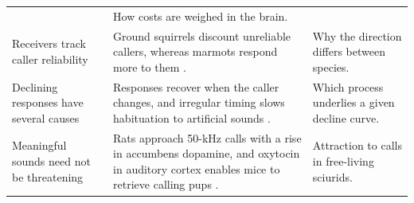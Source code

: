 \begin{table}[tbp]
\begin{tabular}{@{}>{\raggedright\arraybackslash}p{1.35in}>{\raggedright\arraybackslash}p{3.0in}>{\raggedright\arraybackslash}p{1.75in}@{}}
  & How costs are weighed in the brain. \\
Receivers track caller reliability
  & Ground squirrels discount unreliable callers, whereas marmots respond more to them \citep{HareAtkins2001,BlumsteinEtAl2004}.
  & Why the direction differs between species. \\
Declining responses have several causes
  & Responses recover when the caller changes, and irregular timing slows habituation to artificial sounds \citep{Hare1998,Davis1970,HerryEtAl2007}.
  & Which process underlies a given decline curve. \\
Meaningful sounds need not be threatening
  & Rats approach 50-kHz calls with a rise in accumbens dopamine, and oxytocin in auditory cortex enables mice to retrieve calling pups \citep{WilluhnEtAl2014,MarlinEtAl2015}.
  & Attraction to calls in free-living sciurids. \\
\bottomrule
\end{tabular}
\end{table}
